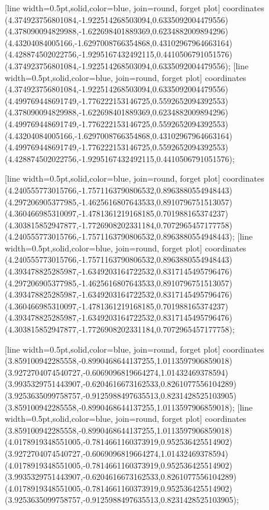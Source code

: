 [line width=0.5pt,solid,color=blue, join=round, forget plot] coordinates {(4.374923756801084,-1.922514268503094,0.6335092004479556) (4.378090094829988,-1.622698401889369,0.6234882009894296) (4.43204084005166,-1.6297008766354868,0.43102967964663164) (4.428874502022756,-1.9295167432492115,0.4410506791051576) (4.374923756801084,-1.922514268503094,0.6335092004479556)};
[line width=0.5pt,solid,color=blue, join=round, forget plot] coordinates {(4.374923756801084,-1.922514268503094,0.6335092004479556) (4.499769448691749,-1.776222153146725,0.5592652094392553) (4.378090094829988,-1.622698401889369,0.6234882009894296) (4.499769448691749,-1.776222153146725,0.5592652094392553) (4.43204084005166,-1.6297008766354868,0.43102967964663164) (4.499769448691749,-1.776222153146725,0.5592652094392553) (4.428874502022756,-1.9295167432492115,0.4410506791051576)};

[line width=0.5pt,solid,color=blue, join=round, forget plot] coordinates {(4.240555773015766,-1.7571163790806532,0.8963880554948443) (4.297206905377985,-1.4625616807643533,0.8910796751513057) (4.360466985310097,-1.4781361219168185,0.701988165374237) (4.303815852947877,-1.7726908202331184,0.7072965457177758) (4.240555773015766,-1.7571163790806532,0.8963880554948443)};
[line width=0.5pt,solid,color=blue, join=round, forget plot] coordinates {(4.240555773015766,-1.7571163790806532,0.8963880554948443) (4.393478825285987,-1.6349203164722532,0.8317145495796476) (4.297206905377985,-1.4625616807643533,0.8910796751513057) (4.393478825285987,-1.6349203164722532,0.8317145495796476) (4.360466985310097,-1.4781361219168185,0.701988165374237) (4.393478825285987,-1.6349203164722532,0.8317145495796476) (4.303815852947877,-1.7726908202331184,0.7072965457177758)};

[line width=0.5pt,solid,color=blue, join=round, forget plot] coordinates {(3.859100942285558,-0.8990468644137255,1.0113597906859018) (3.9272704074540727,-0.6069096819664274,1.01432469378594) (3.9935329751443907,-0.6204616673162533,0.8261077556104289) (3.9253635099758757,-0.9125988497635513,0.8231428525103905) (3.859100942285558,-0.8990468644137255,1.0113597906859018)};
[line width=0.5pt,solid,color=blue, join=round, forget plot] coordinates {(3.859100942285558,-0.8990468644137255,1.0113597906859018) (4.0178919348551005,-0.7814661160373919,0.952536425514902) (3.9272704074540727,-0.6069096819664274,1.01432469378594) (4.0178919348551005,-0.7814661160373919,0.952536425514902) (3.9935329751443907,-0.6204616673162533,0.8261077556104289) (4.0178919348551005,-0.7814661160373919,0.952536425514902) (3.9253635099758757,-0.9125988497635513,0.8231428525103905)};

